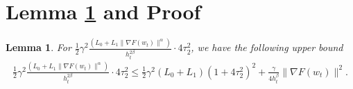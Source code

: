 \documentclass[10pt]{article} %
\def\eqref#1{equation~\ref{#1}}
\newtheorem{remark}{Remark}
\newtheorem{lemma}{Lemma}
\begin{document}
\section{Lemma \ref{upper bound for term 1} and Proof}
\begin{lemma}\label{upper bound for term 1}
For $\frac{1}{2}\gamma^2\frac{(L_0+L_1\big \|\nabla F(w_t) \big \|^{\alpha})}{h_t^{2\beta}}\cdot{4\tau_2^2}$, we have the following upper bound
\begin{align}
    \frac{1}{2}\gamma^2\frac{(L_0+L_1\big \|\nabla F(w_t) \big \|^{\alpha})}{h_t^{2\beta}}\cdot{4\tau_2^2}\leq \frac{1}{2}\gamma^2(L_0+L_1)(1+4\tau_2^2)^2+ \frac{\gamma}{4h_t^{\beta}}\big \|\nabla F(w_t) \big \|^2.
    \label{stochastic noise bound}
\end{align}
\end{lemma}
\end{document}

